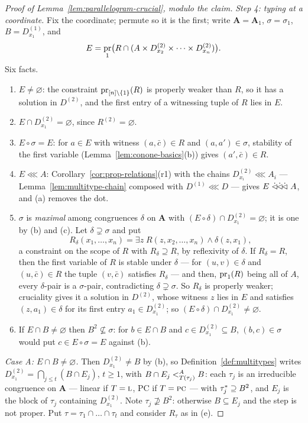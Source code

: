 \begin{proof}[Proof of Lemma~\ref{lem:parallelogram-crucial}, modulo the claim]
\emph{Step 4: typing at a coordinate.} Fix the coordinate; permute so it is
the first; write $\mathbf A=\mathbf A_{1}$, $\sigma=\sigma_{1}$,
$B=D^{(1)}_{x_{1}}$, and
\[
  E=\proj_{1}\bigl(R\cap(A\times D^{(2)}_{x_{2}}\times\dots\times
    D^{(2)}_{x_{n}})\bigr).
\]
Six facts.
\begin{enumerate}\alphlabels\tightlist
\item $E\neq\varnothing$: the constraint $\proj_{[n]\setminus\{1\}}(R)$ is
  properly weaker than $R$, so it has a solution in $D^{(2)}$, and the first
  entry of a witnessing tuple of $R$ lies in $E$.
\item $E\cap D^{(2)}_{x_{1}}=\varnothing$, since $R^{(2)}=\varnothing$.
\item $E\circ\sigma=E$: for $a\in E$ with witness $(a,\bar c)\in R$ and
  $(a,a')\in\sigma$, stability of the first variable
  (Lemma~\ref{lem:conone-basics}(b)) gives $(a',\bar c)\in R$.
\item $E\lll A$: Corollary~\ref{cor:prop-relations}(r1) with the chains
  $D^{(2)}_{x_{i}}\lll A_{i}$ --- Lemma~\ref{lem:multitype-chain} composed
  with $D^{(1)}\lll D$ --- gives $E\dlll A$, and (a) removes the dot.
\item $\sigma$ is \emph{maximal} among congruences $\delta$ on $\mathbf A$
  with $(E\circ\delta)\cap D^{(2)}_{x_{1}}=\varnothing$; it is one by (b) and
  (c). Let $\delta\supsetneq\sigma$ and put
  \[
    R_{\delta}(x_{1},\dots,x_{n})=\exists z\;
      R(z,x_{2},\dots,x_{n})\wedge\delta(z,x_{1}),
  \]
  a constraint on the scope of $R$ with $R_{\delta}\supseteq R$, by
  reflexivity of $\delta$. If $R_{\delta}=R$, then the first variable of $R$
  is stable under $\delta$ --- for $(u,v)\in\delta$ and $(u,\bar c)\in R$ the
  tuple $(v,\bar c)$ satisfies $R_{\delta}$ --- and then, $\proj_{1}(R)$
  being all of $A$, every $\delta$-pair is a $\sigma$-pair, contradicting
  $\delta\supsetneq\sigma$. So $R_{\delta}$ is properly weaker; cruciality
  gives it a solution in $D^{(2)}$, whose witness $z$ lies in $E$ and
  satisfies $(z,a_{1})\in\delta$ for its first entry
  $a_{1}\in D^{(2)}_{x_{1}}$; so $(E\circ\delta)\cap D^{(2)}_{x_{1}}\neq
  \varnothing$.
\item If $E\cap B\neq\varnothing$ then $B^{2}\not\subseteq\sigma$: for
  $b\in E\cap B$ and $c\in D^{(2)}_{x_{1}}\subseteq B$, $(b,c)\in\sigma$
  would put $c\in E\circ\sigma=E$ against (b).
\end{enumerate}

\emph{Case A: $E\cap B\neq\varnothing$.} Then $D^{(2)}_{x_{1}}\neq B$ by (b),
so Definition~\ref{def:multitypes} writes
$D^{(2)}_{x_{1}}=\bigcap_{j\le t}(B\cap E_{j})$, $t\ge1$, with
$B\cap E_{j}\subt[A]{T(\tau_{j})}B$: each $\tau_{j}$ is an irreducible
congruence on $\mathbf A$ --- linear if $T=\TL$, PC if $T=\TPC$ --- with
$\cover{\tau_{j}}\supseteq B^{2}$, and $E_{j}$ is the block of $\tau_{j}$
containing $D^{(2)}_{x_{1}}$. Note $\tau_{j}\not\supseteq B^{2}$: otherwise
$B\subseteq E_{j}$ and the step is not proper. Put
$\tau=\tau_{1}\cap\dots\cap\tau_{t}$ and consider $R_{\tau}$ as in (e).


\end{proof}

